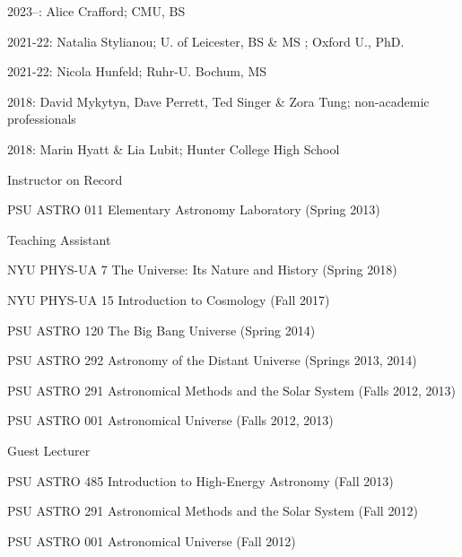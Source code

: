 \documentclass[11pt,letterpaper]{article}
\begin{document}
\begin{list}{}{\malzlist}
	\item 2023--: Alice Crafford; CMU, BS 
	\item 2021-22: Natalia Stylianou; U. of Leicester, BS \& MS ; Oxford U., PhD. 
	\item 2021-22: Nicola Hunfeld; Ruhr-U. Bochum, MS 
	\item 2018: David Mykytyn, Dave Perrett, Ted Singer \& Zora Tung; non-academic professionals
	\item 2018: Marin Hyatt \& Lia Lubit; Hunter College High School 
\end{list}

\begin{list}{}{\malzlist}
\item Instructor on Record
\begin{list}{}{\malzlist}
	\item PSU ASTRO 011 Elementary Astronomy Laboratory (Spring 2013)
\end{list}
\item Teaching Assistant
\begin{list}{}{\malzlist}
	\item NYU PHYS-UA 7 The Universe: Its Nature and History (Spring 2018)
	\item NYU PHYS-UA 15 Introduction to Cosmology (Fall 2017)
	\item PSU ASTRO 120 The Big Bang Universe (Spring 2014)
	\item PSU ASTRO 292 Astronomy of the Distant Universe (Springs 2013, 2014)
	\item PSU ASTRO 291 Astronomical Methods and the Solar System (Falls 2012, 2013)
	\item PSU ASTRO 001 Astronomical Universe (Falls 2012, 2013)
\end{list}
\item Guest Lecturer
\begin{list}{}{\malzlist}
	\item PSU ASTRO 485 Introduction to High-Energy Astronomy (Fall 2013)%
	\item PSU ASTRO 291 Astronomical Methods and the Solar System (Fall 2012) %
	\item PSU ASTRO 001 Astronomical Universe (Fall 2012) %
\end{list}
\end{list}
\end{document}
